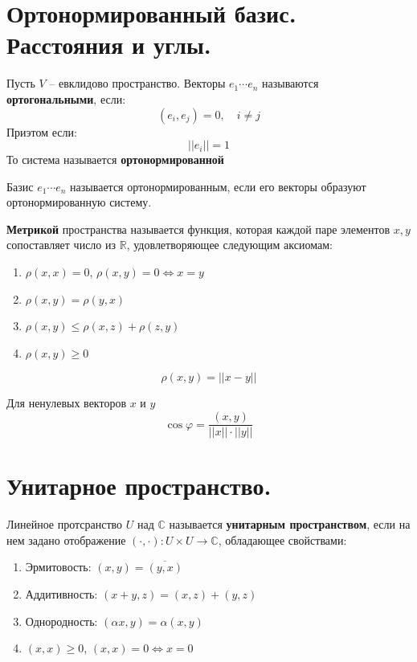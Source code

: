 \documentclass[14pt]{extreport}
\begin{document}
    \chapter{Ортонормированный базис. Расстояния и углы.}
    \begin{defbox}
        Пусть $V$ -- евклидово пространство. Векторы $e_1\cdots e_n$ называются \textbf{ортогональными}, если:
        $$
        (e_i, e_j) = 0, \quad i \ne j
        $$
        Приэтом если:
        $$
        ||e_i|| = 1
        $$
        То система называется \textbf{ортонормированной}
    \end{defbox}
    \begin{defbox}
        Базис $e_1\cdots e_n$ называется ортонормированным, если его векторы образуют ортонормированную систему.
    \end{defbox}
    \begin{defbox}
        \textbf{Метрикой} пространства называется функция, которая каждой паре элементов $x,y$ сопоставляет число из $\mathbb{R}$, удовлетворяющее следующим аксиомам:
        \begin{enumerate}
            \item $\rho(x,x) = 0$, $\rho(x,y)=0\Leftrightarrow x = y$
            \item $\rho(x,y)=\rho(y,x)$
            \item $\rho(x,y)\le \rho(x,z) + \rho(z,y)$
            \item $\rho(x,y) \ge 0$
        \end{enumerate}
        $$
        \rho(x, y) = ||x-y||
        $$
    \end{defbox}

    \begin{defbox}
        Для ненулевых векторов $x$ и $y$
        $$
        \cos\varphi = \frac{(x,y)}{||x|| \cdot ||y||}
        $$
    \end{defbox}

    \chapter{Унитарное пространство.}

    \begin{defbox}
        Линейное протсранство $U$ над $\mathbb{C}$ называется \textbf{унитарным пространством}, если на нем задано отображение $(\cdot, \cdot):U\times U \rightarrow \mathbb{C}$, обладающее свойствами:
        \begin{enumerate}
            \item Эрмитовость: $(x, y) = \overline{(y,x)}$
            \item Аддитивность: $(x+y,z) = (x,z)+(y,z)$
            \item Однородность: $(\alpha x, y)=\alpha(x,y)$
            \item $(x,x)\ge 0$, $(x,x)=0\Leftrightarrow x =0$
        \end{enumerate}
    \end{defbox}
\end{document}
